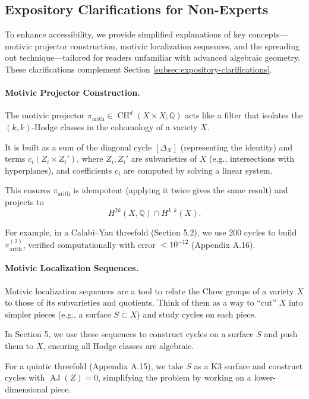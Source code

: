 \documentclass[11pt]{article}
\DeclareMathOperator{\CH}{CH}
\DeclareMathOperator{\AJ}{AJ}
\begin{document}
\subsection{Expository Clarifications for Non-Experts}\label{subsec:expository-clarifications-addendum}To enhance accessibility, we provide simplified explanations of key concepts—motivic projector construction, motivic localization sequences, and the spreading out technique—tailored for readers unfamiliar with advanced algebraic geometry. These clarifications complement Section \ref{subsec:expository-clarifications}.
\paragraph{Motivic Projector Construction.}
The motivic projector \( \pi_{\mathrm{arith}} \in \CH^d(X \times X; \mathbb{Q}) \) acts like a filter that isolates the \( (k,k) \)-Hodge classes in the cohomology of a variety \( X \).

It is built as a sum of the diagonal cycle \( [\Delta_X] \) (representing the identity) and terms \( c_i (Z_i \times Z_i') \), where \( Z_i, Z_i' \) are subvarieties of \( X \) (e.g., intersections with hyperplanes), and coefficients \( c_i \) are computed by solving a linear system.

This ensures \( \pi_{\mathrm{arith}} \) is idempotent (applying it twice gives the same result) and projects to
\[
H^{2k}(X, \mathbb{Q}) \cap H^{k,k}(X).
\]

For example, in a Calabi–Yau threefold (Section 5.2), we use 200 cycles to build \( \pi_{\mathrm{arith}}^{(2)} \), verified computationally with error \( < 10^{-12} \) (Appendix A.16).


\paragraph{Motivic Localization Sequences.}
Motivic localization sequences are a tool to relate the Chow groups of a variety \( X \) to those of its subvarieties and quotients. Think of them as a way to “cut” \( X \) into simpler pieces (e.g., a surface \( S \subset X \)) and study cycles on each piece.

In Section 5, we use these sequences to construct cycles on a surface \( S \) and push them to \( X \), ensuring all Hodge classes are algebraic.

For a quintic threefold (Appendix A.15), we take \( S \) as a K3 surface and construct cycles with \( \AJ(Z) = 0 \), simplifying the problem by working on a lower-dimensional piece.
\end{document}
